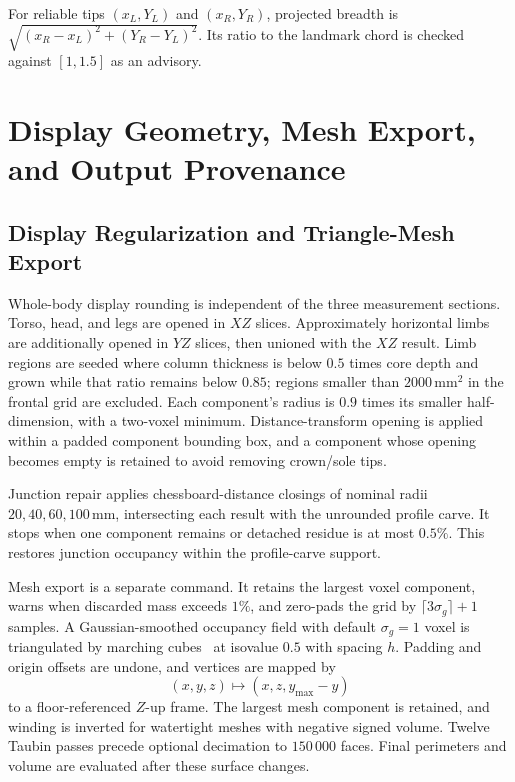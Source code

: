 \documentclass[11pt,a4paper]{article}
\numberwithin{equation}{section}
\begin{document}
For reliable tips $(x_L,Y_L)$ and $(x_R,Y_R)$, projected breadth is $\sqrt{(x_R-x_L)^2+(Y_R-Y_L)^2}$. Its ratio to the landmark chord is checked against $[1,1.5]$ as an advisory.

\section{Display Geometry, Mesh Export, and Output Provenance}
\subsection{Display Regularization and Triangle-Mesh Export}
\label{subsec:mesh_export}
Whole-body display rounding is independent of the three measurement sections. Torso, head, and legs are opened in $XZ$ slices. Approximately horizontal limbs are additionally opened in $YZ$ slices, then unioned with the $XZ$ result. Limb regions are seeded where column thickness is below $0.5$ times core depth and grown while that ratio remains below $0.85$; regions smaller than $2000$\,mm$^2$ in the frontal grid are excluded. Each component's radius is $0.9$ times its smaller half-dimension, with a two-voxel minimum. Distance-transform opening is applied within a padded component bounding box, and a component whose opening becomes empty is retained to avoid removing crown/sole tips.

Junction repair applies chessboard-distance closings of nominal radii $20,40,60,100$\,mm, intersecting each result with the unrounded profile carve. It stops when one component remains or detached residue is at most $0.5\%$. This restores junction occupancy within the profile-carve support.

Mesh export is a separate command. It retains the largest voxel component, warns when discarded mass exceeds $1\%$, and zero-pads the grid by $\lceil3\sigma_g\rceil+1$ samples. A Gaussian-smoothed occupancy field with default $\sigma_g=1$ voxel is triangulated by marching cubes~\cite{lorensen1987marching} at isovalue $0.5$ with spacing $h$. Padding and origin offsets are undone, and vertices are mapped by
\begin{equation}
(x,y,z)\mapsto(x,z,y_{\max}-y)
\end{equation}
to a floor-referenced $Z$-up frame. The largest mesh component is retained, and winding is inverted for watertight meshes with negative signed volume. Twelve Taubin passes precede optional decimation to $150\,000$ faces. Final perimeters and volume are evaluated after these surface changes.
\end{document}
